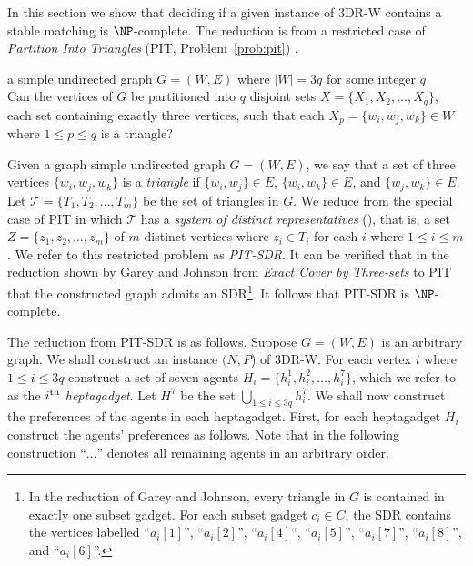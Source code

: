 In this section we show that deciding if a given instance of 3DR-W contains a stable matching is $\NP$-complete. The reduction is from a restricted case of \emph{Partition Into Triangles} (PIT, Problem~\ref{prob:pit}) \cite{GJ79}. 

\begin{myproblem}
\label{prob:pit}
\begin{samepage}
\begin{adjustwidth}{8pt}{8pt}
\inp a simple undirected graph $G=(W, E)$ where $|W|=3q$ for some integer $q$\\
\ques Can the vertices of $G$ be partitioned into $q$ disjoint sets $X=\{ X_1, X_2, \dots, X_q \}$, each set containing exactly three vertices, such that each $X_p=\{ w_i, w_j, w_k \}\in W$ where $1\leq p\leq q$ is a triangle?
\end{adjustwidth}
\end{samepage}
\end{myproblem}

Given a graph simple undirected graph $G = (W, E)$, we say that a set of three vertices $\{ w_i, w_j, w_k \}$ is a \emph{triangle} if $\{ w_i, w_j \} \in E$, $\{ w_i, w_k \} \in E$, and $\{ w_j, w_k \} \in E$. Let $\mathcal{T} = \{ T_1, T_2, \dots, T_m \}$ be the set of triangles in $G$. We reduce from the special case of PIT in which $\mathcal{T}$ has a \emph{system of distinct representatives} (), that is, a set $Z = \{ z_1, z_2, \dots, z_m \}$ of $m$ distinct vertices where $z_i \in T_i$ for each $i$ where $1\leq i \leq m$. We refer to this restricted problem as \emph{PIT-SDR}. It can be verified that in the reduction shown by Garey and Johnson \cite[Theorem~3.7]{GJ79} from \emph{Exact Cover by Three-sets} to PIT that the constructed graph admits an SDR\footnote{In the reduction of Garey and Johnson, every triangle in $G$ is contained in exactly one subset gadget. For each subset gadget $c_i \in C$, the SDR contains the vertices labelled ``$a_i[1]$'', ``$a_i[2]$'', ``$a_i[4]$``, ``$a_i[5]$'', ``$a_i[7]$'', ``$a_i[8]$'', and ``$a_i[6]$''.}. It follows that PIT-SDR is $\NP$-complete.

The reduction from PIT-SDR is as follows. Suppose $G = (W, E)$ is an arbitrary graph. We shall construct an instance $(N, P$) of 3DR-W. For each vertex $i$ where $1 \leq i \leq 3q$ construct a set of seven agents $H_i = \{ h_i^1, h_i^2, \dots, h_i^7 \}$, which we refer to as the \emph{$i\textsuperscript{th}$ heptagadget}. Let $H^7$ be the set $\bigcup_{1 \leq i \leq 3q} h_i^7$. We shall now construct the preferences of the agents in each heptagadget. First, for each heptagadget $H_i$ construct the agents' preferences as follows. Note that in the following construction ``$\dots$'' denotes all remaining agents in an arbitrary order.

